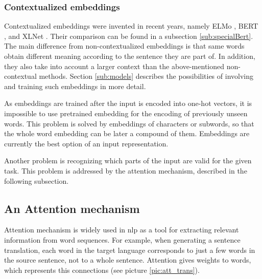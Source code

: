 \subsubsection{Contextualized embeddings}
Contextualized embeddings were invented in recent years, namely ELMo \citep{Peters2018}, BERT \citep{Devlin2019}, and XLNet \citep{Yang2019}. %
Their comparison can be found in a subsection \ref{sub:specialBert}. The main difference from non-contextualized embeddings is that same words obtain different meaning according to the sentence they are part of. In addition, they also take into account a larger context than the above-mentioned non-contextual methods. Section \ref{sub:models} describes the possibilities of involving and training such embeddings in more detail.
\par
As embeddings are trained after the input is encoded into one-hot vectors, it is impossible to use pretrained embedding for the encoding of previously unseen words. This problem is solved by embeddings of characters or subwords, so that the whole word embedding can be later a compound of them. Embeddings are currently the best option of an input representation. \bigskip
\par Another problem is recognizing which parts of the input are valid for the given task. This problem is addressed by the attention mechanism, described in the following subsection. 

\subsection{An Attention mechanism}
\label{sub:attention}
Attention mechanism \citep{Bahdanau} is widely used in \acrshort{nlp} as a tool for extracting relevant information from word sequences. For example, when generating a sentence translation, each word in the target language corresponds to just a few words in the source sentence, not to a whole sentence. Attention gives weights to words, which represents this connections (see picture \ref{pic:att_trans}).

